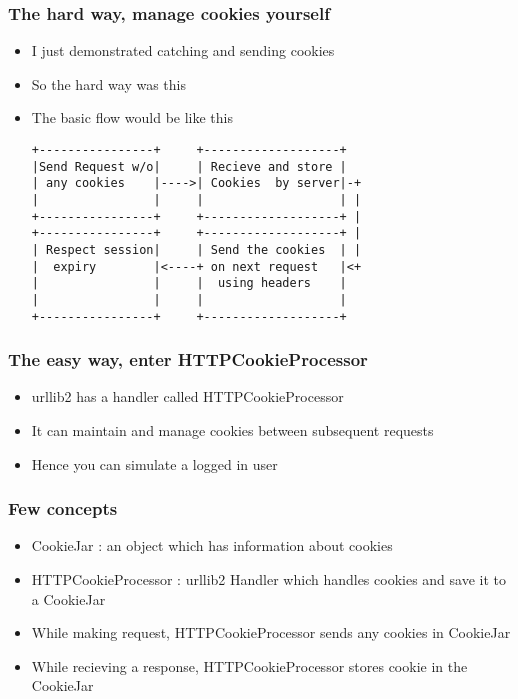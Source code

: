 \documentclass{beamer}
\begin{document}
\begin{frame}[fragile]
\frametitle{The hard way, manage cookies yourself}
\label{sec-9_13}


\begin{itemize}
\item I just demonstrated catching and sending cookies
\item So the hard way was this
\item The basic flow would be like this
\begin{verbatim}
+----------------+     +-------------------+
|Send Request w/o|     | Recieve and store |
| any cookies    |---->| Cookies  by server|-+
|                |     |                   | |
+----------------+     +-------------------+ |
+----------------+     +-------------------+ |
| Respect session|     | Send the cookies  | |
|  expiry        |<----+ on next request   |<+
|                |     |  using headers    |
|                |     |                   |
+----------------+     +-------------------+
\end{verbatim}
\end{itemize}
\end{frame}
\begin{frame}
\frametitle{The easy way, enter HTTPCookieProcessor}
\label{sec-9_14}


\begin{itemize}
\item urllib2 has a handler called HTTPCookieProcessor
\item It can maintain and manage cookies between subsequent requests
\item Hence you can simulate a logged in user
\end{itemize}
\end{frame}
\begin{frame}
\frametitle{Few concepts}
\label{sec-9_15}


\begin{itemize}
\item CookieJar : an object which has information about cookies
\item HTTPCookieProcessor : urllib2 Handler which handles cookies and save it to a CookieJar
\item While making request, HTTPCookieProcessor sends any cookies in CookieJar
\item While recieving a response, HTTPCookieProcessor stores cookie in the CookieJar
\end{itemize}
\end{frame}
\end{document}
